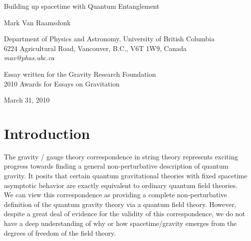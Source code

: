 \documentclass[12pt,epsf]{article}
\renewcommand{\(}{\left(}
\renewcommand{\)}{\right)}
\begin{document}
\begin{titlepage}
\hfill

\vspace*{20mm}
\begin{center}
{\Large  Building up spacetime with Quantum Entanglement}

\vspace*{15mm}
\vspace*{1mm}

Mark Van Raamsdonk

\vspace*{1cm}

{Department of Physics and Astronomy,
University of British Columbia\\
6224 Agricultural Road,
Vancouver, B.C., V6T 1W9, Canada\\
{\it mav@phas.ubc.ca}
}

\vspace*{1cm}
\end{center}

\begin{abstract}
In this essay, we argue that the emergence of classically connected spacetimes is intimately related to the quantum entanglement of degrees of freedom in a non-perturbative description of quantum gravity. Disentangling the degrees of freedom associated with two regions of spacetime results in these regions pulling apart and pinching off from each other in a way that can be quantified by standard measures of entanglement.

\end{abstract}
\vskip 2cm

\begin{center}
Essay written for the Gravity Research Foundation \\ 2010 Awards for Essays on Gravitation
\vskip 1cm

March 31, 2010
\end{center}
\end{titlepage}

\section{Introduction}

The gravity / gauge theory correspondence \cite{bfss, malda,agmoo} in string theory represents exciting progress towards finding a general non-perturbative description of quantum gravity. It posits that certain quantum gravitational theories with fixed spacetime asymptotic behavior are exactly equivalent to ordinary quantum field theories. We can view this correspondence as providing a complete non-perturbative definition of the quantum gravity theory via a quantum field theory. However, despite a great deal of evidence for the validity of this correspondence, we do not have a deep understanding of why or how spacetime/gravity emerges from the degrees of freedom of the field theory.
\end{document}
